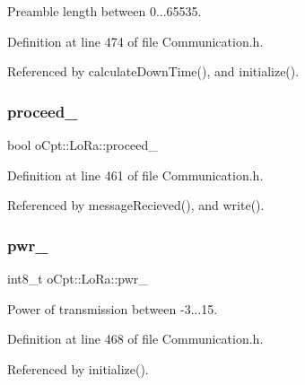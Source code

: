 Preamble length between 0...65535. 



Definition at line 474 of file Communication.\+h.



Referenced by calculate\+Down\+Time(), and initialize().

\hypertarget{classo_cpt_1_1_lo_ra_a63fc8aa4abe5d2df5cdee3757fc7cdf9}{}\label{classo_cpt_1_1_lo_ra_a63fc8aa4abe5d2df5cdee3757fc7cdf9} 
\subsubsection{\texorpdfstring{proceed\+\_\+}{proceed\_}}
{\footnotesize\ttfamily bool o\+Cpt\+::\+Lo\+Ra\+::proceed\+\_\+\hspace{0.3cm}{\ttfamily [protected]}}



Definition at line 461 of file Communication.\+h.



Referenced by message\+Recieved(), and write().

\hypertarget{classo_cpt_1_1_lo_ra_a26a74b857c4fe90af4217f38dc735220}{}\label{classo_cpt_1_1_lo_ra_a26a74b857c4fe90af4217f38dc735220} 
\subsubsection{\texorpdfstring{pwr\+\_\+}{pwr\_}}
{\footnotesize\ttfamily int8\+\_\+t o\+Cpt\+::\+Lo\+Ra\+::pwr\+\_\+\hspace{0.3cm}{\ttfamily [protected]}}



Power of transmission between -\/3...15. 



Definition at line 468 of file Communication.\+h.



Referenced by initialize().

\hypertarget{classo_cpt_1_1_lo_ra_ad82916e0708ce81df40be3a264446c94}{}\label{classo_cpt_1_1_lo_ra_ad82916e0708ce81df40be3a264446c94} 
